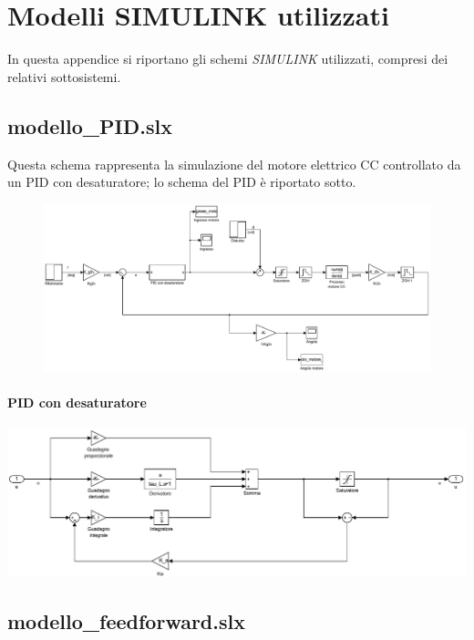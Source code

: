 \section{Modelli SIMULINK utilizzati}
\label{app:SIMULINK}

	In questa appendice si riportano gli schemi \textit{SIMULINK} utilizzati, compresi dei relativi sottosistemi.

	\subsection{modello\_PID.slx}
	\label{subapp:modelloPID}
	
		Questa schema rappresenta la simulazione del motore elettrico CC controllato da un PID con desaturatore; lo schema del PID è riportato sotto.
		
		\begin{figure}[H]
			\centering
			\includegraphics[scale=0.6]{./Figure/SIMULINK/modello_PID.pdf}
		\end{figure}
		
		\paragraph{PID con desaturatore}
		
			\begin{center}
				\includegraphics[scale=0.45]{./Figure/SIMULINK/PID_desaturatore.pdf}
			\end{center}
			
	\subsection{modello\_feedforward.slx}
	\label{subapp:modelloFF}
	
